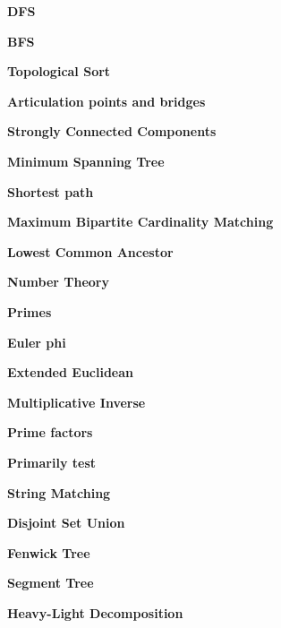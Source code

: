 \documentclass[a4paper, 13pt, twocolumn, landscape]{book}
\begin{document}
  \pagestyle{fancy}

  \setlength{\columnseprule}{1pt}
  \large

  \textbf{DFS}
  
  \textbf{BFS}
  
  \textbf{Topological Sort}
  
  \textbf{Articulation points and bridges}
  
  \textbf{Strongly Connected Components}
  
  \textbf{Minimum Spanning Tree}
  
  
  \textbf{Shortest path}
  
  
  
  
  \textbf{Maximum Bipartite Cardinality Matching}
  
  \textbf{Lowest Common Ancestor}
  


  \textbf{Number Theory}
  
  \textbf{Primes}
  
  \textbf{Euler phi}
  
  \textbf{Extended Euclidean}
  
  \textbf{Multiplicative Inverse}
  
  \textbf{Prime factors}
  
  
  \textbf{Primarily test}
  


  \textbf{String Matching}
  
  
  


  \textbf{Disjoint Set Union}
  
  \textbf{Fenwick Tree}
  
  \textbf{Segment Tree}
  
  \textbf{Heavy-Light Decomposition}
  
\end{document}
